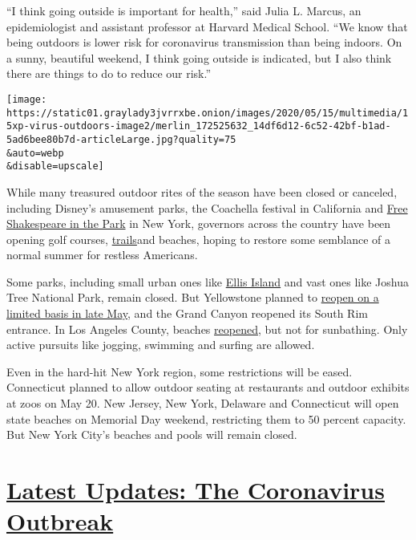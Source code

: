 ``I think going outside is important for health,'' said Julia L. Marcus,
an epidemiologist and assistant professor at Harvard Medical School.
``We know that being outdoors is lower risk for coronavirus transmission
than being indoors. On a sunny, beautiful weekend, I think going outside
is indicated, but I also think there are things to do to reduce our
risk.''

\texttt{[image: https://static01.graylady3jvrrxbe.onion/images/2020/05/15/multimedia/15xp-virus-outdoors-image2/merlin\_172525632\_14df6d12-6c52-42bf-b1ad-5ad6bee80b7d-articleLarge.jpg?quality=75\\\&auto=webp\\\&disable=upscale]}

While many treasured outdoor rites of the season have been closed or
canceled, including Disney's amusement parks, the Coachella festival in
California and
\href{https://publictheater.org/programs/shakespeare-in-the-park/}{Free
Shakespeare in the Park} in New York, governors across the country have
been opening golf courses,
\href{https://www.nytimes3xbfgragh.onion/2020/05/21/us/appalachian-trail-coronavirus.html}{trails}and
beaches, hoping to restore some semblance of a normal summer for
restless Americans.

Some parks, including small urban ones like
\href{https://www.nps.gov/elis/index.htm}{Ellis Island} and vast ones
like Joshua Tree National Park, remain closed. But Yellowstone planned
to \href{https://www.nps.gov/yell/learn/news/20015.htm}{reopen on a
limited basis in late May}, and the Grand Canyon reopened its South Rim
entrance. In Los Angeles County, beaches
\href{https://twitter.com/SupJaniceHahn/status/1259875923785965568?s=20}{reopened},
but not for sunbathing. Only active pursuits like jogging, swimming and
surfing are allowed.

Even in the hard-hit New York region, some restrictions will be eased.
Connecticut planned to allow outdoor seating at restaurants and outdoor
exhibits at zoos on May 20. New Jersey, New York, Delaware and
Connecticut will open state beaches on Memorial Day weekend, restricting
them to 50 percent capacity. But New York City's beaches and pools will
remain closed.

\hypertarget{latest-updates-the-coronavirus-outbreak}{%
\section{\texorpdfstring{\href{https://www.nytimes3xbfgragh.onion/2020/09/04/world/covid-19-coronavirus.html?action=click\&pgtype=Article\&state=default\&region=MAIN_CONTENT_1\&context=storylines_live_updates}{Latest
Updates: The Coronavirus
Outbreak}}{Latest Updates: The Coronavirus Outbreak}}\label{latest-updates-the-coronavirus-outbreak}}

